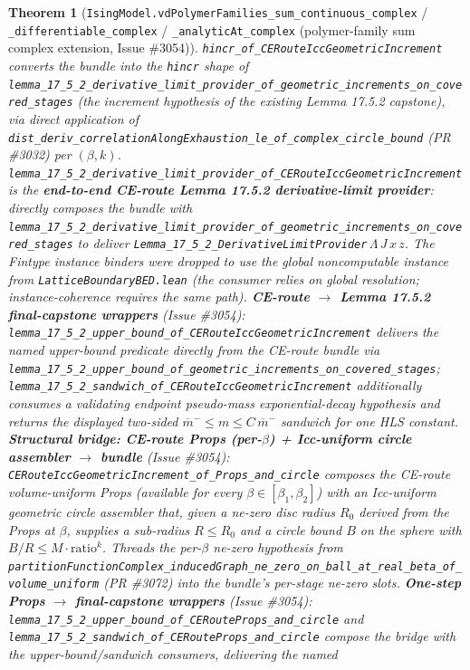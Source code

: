 \documentclass[a4paper,11pt]{article}
\newtheorem{theorem}{Theorem}
\begin{document}
\begin{theorem}[\texttt{IsingModel.vdPolymerFamilies\_sum\_continuous\_complex} /
\texttt{\_differentiable\_complex} / \texttt{\_analyticAt\_complex} (polymer-family sum
complex extension, Issue \#3054)]
\texttt{hincr\_of\_CERouteIccGeometricIncrement} converts the bundle into the
\texttt{hincr} shape of
\texttt{lemma\_17\_5\_2\_derivative\_limit\_provider\_of\_geometric\_increments\_on\_covered\_stages}
(the increment hypothesis of the existing Lemma 17.5.2 capstone), via direct
application of \texttt{dist\_deriv\_correlationAlongExhaustion\_le\_of\_complex\_circle\_bound}
(PR \#3032) per \((\beta,k)\).
\texttt{lemma\_17\_5\_2\_derivative\_limit\_provider\_of\_CERouteIccGeometricIncrement}
is the \textbf{end-to-end CE-route Lemma 17.5.2 derivative-limit provider}:
directly composes the bundle with
\texttt{lemma\_17\_5\_2\_derivative\_limit\_provider\_of\_geometric\_increments\_on\_covered\_stages}
to deliver \texttt{Lemma\_17\_5\_2\_DerivativeLimitProvider}\(\,\Lambda\,J\,x\,z\).
The Fintype instance binders were dropped to use the global noncomputable
instance from \texttt{LatticeBoundaryBED.lean} (the consumer relies on global
resolution; instance-coherence requires the same path).
\textbf{CE-route \(\to\) Lemma 17.5.2 final-capstone wrappers} (Issue \#3054):
\texttt{lemma\_17\_5\_2\_upper\_bound\_of\_CERouteIccGeometricIncrement}
delivers the named upper-bound predicate directly from the CE-route bundle via
\texttt{lemma\_17\_5\_2\_upper\_bound\_of\_geometric\_increments\_on\_covered\_stages};
\texttt{lemma\_17\_5\_2\_sandwich\_of\_CERouteIccGeometricIncrement} additionally
consumes a validating endpoint pseudo-mass exponential-decay hypothesis and
returns the displayed two-sided \(\overline{m}^-\le m \le C\,\overline{m}^-\)
sandwich for one HLS constant.
\textbf{Structural bridge: CE-route Props (per-\(\beta\)) + Icc-uniform circle
assembler \(\to\) bundle} (Issue \#3054):
\texttt{CERouteIccGeometricIncrement\_of\_Props\_and\_circle} composes the
CE-route volume-uniform Props (available for every \(\beta\in[\beta_1,\beta_2]\))
with an Icc-uniform geometric circle assembler that, given a ne-zero disc
radius \(R_0\) derived from the Props at \(\beta\), supplies a sub-radius
\(R\le R_0\) and a circle bound \(B\) on the sphere with
\(B/R\le M\cdot\mathrm{ratio}^k\). Threads the per-\(\beta\) ne-zero hypothesis
from
\texttt{partitionFunctionComplex\_inducedGraph\_ne\_zero\_on\_ball\_at\_real\_beta\_of\_volume\_uniform}
(PR \#3072) into the bundle's per-stage ne-zero slots.
\textbf{One-step Props \(\to\) final-capstone wrappers} (Issue \#3054):
\texttt{lemma\_17\_5\_2\_upper\_bound\_of\_CERouteProps\_and\_circle} and
\texttt{lemma\_17\_5\_2\_sandwich\_of\_CERouteProps\_and\_circle} compose the
bridge with the upper-bound/sandwich consumers, delivering the named

\end{theorem}
\end{document}
